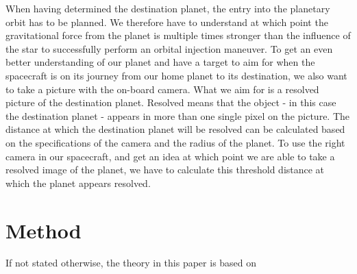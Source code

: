 \documentclass[reprint,english,notitlepage]{revtex4-2}
\begin{document}
When having determined the destination planet, the entry into the planetary orbit has to be planned.
We therefore have to understand at which point the gravitational force from the planet is multiple times stronger than the influence of the star to successfully perform an orbital injection maneuver.
To get an even better understanding of our planet and have a target to aim for when the spacecraft is on its journey from our home planet to its destination, we also want to take a picture with the on-board camera.
What we aim for is a resolved picture of the destination planet.
Resolved means that the object - in this case the destination planet - appears in more than one single pixel on the picture.
The distance at which the destination planet will be resolved can be calculated based on the specifications of the camera and the radius of the planet.
To use the right camera in our spacecraft, and get an idea at which point we are able to take a resolved image of the planet, we have to calculate this threshold distance at which the planet appears resolved.



\section{Method} \label{sec:method}
If not stated otherwise, the theory in this paper is based on ~\parencite[][]{lecture_notes_part1d}
\end{document}
